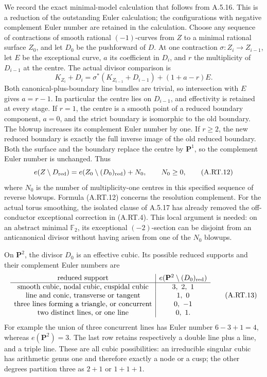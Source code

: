 We record the exact minimal-model calculation that follows from
A.5.16. This is a reduction of the outstanding Euler calculation;
the configurations with negative complement Euler number are
retained in the calculation.
Choose any sequence of contractions of smooth rational
$(-1)$-curves from $Z$ to a minimal rational surface $Z_0$,
and let $D_0$ be the pushforward of $D$. At one contraction
$\sigma:Z_i\to Z_{i-1}$, let $E$ be the exceptional curve,
$a$ its coefficient in $D_i$, and $r$ the multiplicity of
$D_{i-1}$ at the centre. The actual divisor comparison is
\[
 K_{Z_i}+D_i
   =\sigma^*(K_{Z_{i-1}}+D_{i-1})+(1+a-r)E.
 \tag{A.RT.11}
\]
Both canonical-plus-boundary line bundles are trivial, so
intersection with $E$ gives $a=r-1$. In particular the centre
lies on $D_{i-1}$, and effectivity is retained at every stage.
If $r=1$, the centre is a smooth point of a reduced boundary
component, $a=0$, and the strict boundary is isomorphic to the
old boundary. The blowup increases its complement Euler number
by one. If $r\ge2$, the new reduced boundary is exactly the
full inverse image of the old reduced boundary. Both the
surface and the boundary replace the centre by $\mathbf P^1$,
so the complement Euler number is unchanged. Thus
\[
 e(Z\setminus D_{\rm red})
 =e(Z_0\setminus (D_0)_{\rm red})+N_0,
 \qquad N_0\ge0,
 \tag{A.RT.12}
\]
where $N_0$ is the number of multiplicity-one centres in this
specified sequence of reverse blowups. Formula (A.RT.12) concerns
the resolution complement. For the actual torus smoothing,
the isolated clause of A.5.17 has already removed the
off-conductor exceptional correction in (A.RT.4). This local
argument is needed: on an abstract minimal $\mathbb F_2$,
its exceptional $(-2)$-section can be disjoint from an
anticanonical divisor without having arisen from one of the
$N_0$ blowups.

On $\mathbf P^2$, the divisor $D_0$ is an effective cubic.
Its possible reduced supports and their complement Euler
numbers are
\[
\begin{array}{c|c}
 \text{reduced support}&e(\mathbf P^2\setminus(D_0)_{\rm red})\\ \hline
 \text{smooth cubic, nodal cubic, cuspidal cubic}&3,\ 2,\ 1\\
 \text{line and conic, transverse or tangent}&1,\ 0\\
 \text{three lines forming a triangle, or concurrent}&0,\ -1\\
 \text{two distinct lines, or one line}&0,\ 1.
\end{array}
\tag{A.RT.13}
\]
For example the union of three concurrent lines has Euler
number $6-3+1=4$, whereas $e(\mathbf P^2)=3$.
The last row retains respectively a double line plus a line,
and a triple line. These are all cubic possibilities: an
irreducible singular cubic has arithmetic genus one and
therefore exactly a node or a cusp; the other degrees partition
three as $2+1$ or $1+1+1$.

